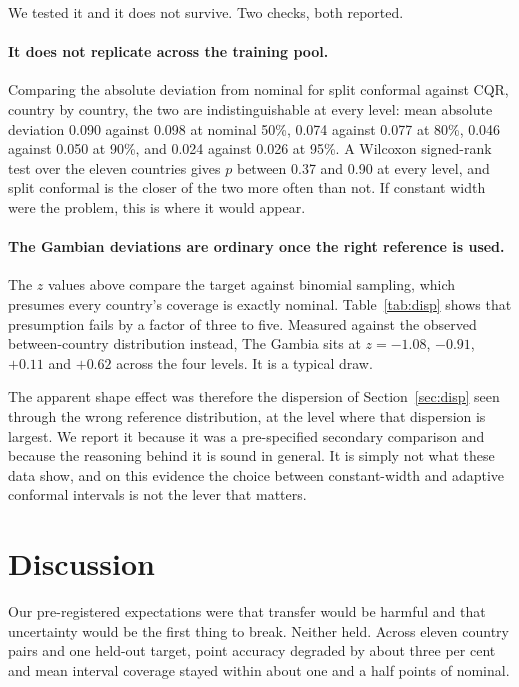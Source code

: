 \documentclass[11pt]{article}
\begin{document}
We tested it and it does not survive. Two checks, both reported.

\paragraph{It does not replicate across the training pool.} Comparing the
absolute deviation from nominal for split conformal against CQR, country by
country, the two are indistinguishable at every level: mean absolute deviation
0.090 against 0.098 at nominal 50\%, 0.074 against 0.077 at 80\%, 0.046 against
0.050 at 90\%, and 0.024 against 0.026 at 95\%. A Wilcoxon signed-rank test over
the eleven countries gives $p$ between 0.37 and 0.90 at every level, and split
conformal is the closer of the two more often than not. If constant width were
the problem, this is where it would appear.

\paragraph{The Gambian deviations are ordinary once the right reference is
used.} The $z$ values above compare the target against binomial sampling, which
presumes every country's coverage is exactly nominal. Table~\ref{tab:disp} shows
that presumption fails by a factor of three to five. Measured against the
observed between-country distribution instead, The Gambia sits at $z = -1.08$,
$-0.91$, $+0.11$ and $+0.62$ across the four levels. It is a typical draw.

The apparent shape effect was therefore the dispersion of
Section~\ref{sec:disp} seen through the wrong reference distribution, at the
level where that dispersion is largest. We report it because it was a
pre-specified secondary comparison and because the reasoning behind it is sound
in general. It is simply not what these data show, and on this evidence the
choice between constant-width and adaptive conformal intervals is not the lever
that matters.


\section{Discussion}
\label{sec:disc}

Our pre-registered expectations were that transfer would be harmful and that
uncertainty would be the first thing to break. Neither held. Across eleven
country pairs and one held-out target, point accuracy degraded by about three
per cent and mean interval coverage stayed within about one and a half points of
nominal.
\end{document}
